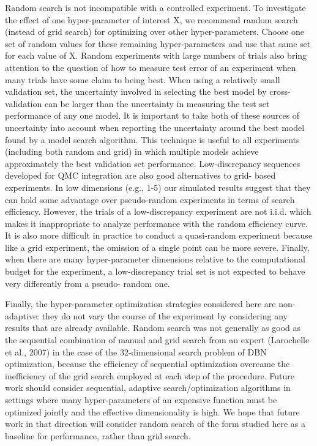 Random search is not incompatible with a controlled experiment. To investigate the effect of one hyper-parameter of interest X, we recommend random search (instead of grid search) for optimizing over other hyper-parameters. Choose one set of random values for these remaining hyper-parameters and use that same set for each value of X.
Random experiments with large numbers of trials also bring attention to the question of how to measure test error of an experiment when many trials have some claim to being best. When using a relatively small validation set, the uncertainty involved in selecting the best model by cross- validation can be larger than the uncertainty in measuring the test set performance of any one model. It is important to take both of these sources of uncertainty into account when reporting the uncertainty around the best model found by a model search algorithm. This technique is useful to all experiments (including both random and grid) in which multiple models achieve approximately the best validation set performance.
Low-discrepancy sequences developed for QMC integration are also good alternatives to grid- based experiments. In low dimensions (e.g., 1-5) our simulated results suggest that they can hold some advantage over pseudo-random experiments in terms of search efficiency. However, the trials of a low-discrepancy experiment are not i.i.d. which makes it inappropriate to analyze performance with the random efficiency curve. It is also more difficult in practice to conduct a quasi-random experiment because like a grid experiment, the omission of a single point can be more severe. Finally, when there are many hyper-parameter dimensions relative to the computational budget for the experiment, a low-discrepancy trial set is not expected to behave very differently from a pseudo- random one.

Finally, the hyper-parameter optimization strategies considered here are non-adaptive: they do not vary the course of the experiment by considering any results that are already available. Random search was not generally as good as the sequential combination of manual and grid search from an expert (Larochelle et al., 2007) in the case of the 32-dimensional search problem of DBN optimization, because the efficiency of sequential optimization overcame the inefficiency of the grid search employed at each step of the procedure. Future work should consider sequential, adaptive search/optimization algorithms in settings where many hyper-parameters of an expensive function must be optimized jointly and the effective dimensionality is high. We hope that future work in that direction will consider random search of the form studied here as a baseline for performance, rather than grid search.



